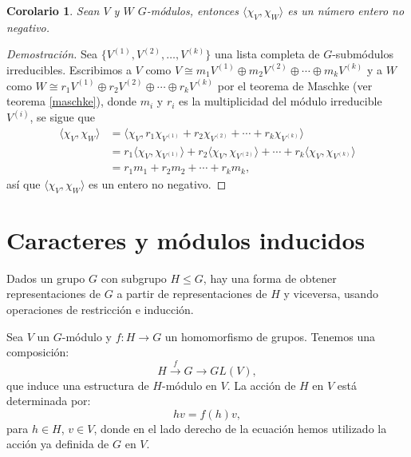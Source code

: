 \documentclass[12pt]{book}
\newtheorem{corollary}[theorem]{Corolario}
\theoremstyle{definition}
\newtheorem{definition}[theorem]{Definición}
\newcounter{in}
\newcounter{ini}
\begin{document}
\begin{corollary}
  \label{prod-car-pos}
  Sean $V$ y $W$ $G$-módulos, entonces $\langle\chi_{V},\chi_{W}\rangle$ es un número entero no negativo.
\end{corollary}
\begin{proof}[Demostración]
  Sea $\{V^{(1)},V^{(2)},\ldots,V^{(k)}\}$ una lista completa de $G$-submódulos
  irreducibles. Escribimos a $V$ como $V\cong
  m_{1}V^{(1)}\oplus m_{2}V^{(2)}\oplus\cdots\oplus m_{k}V^{(k)}$ y a $W$ como $W\cong
  r_{1}V^{(1)}\oplus r_{2}V^{(2)}\oplus\cdots\oplus r_{k}V^{(k)}$ por el
  teorema de Maschke (ver teorema \ref{maschke}), donde $m_{i}$ y $r_{i}$ es la multiplicidad del módulo
  irreducible $V^{(i)}$, se sigue que
  \begin{align*}
    \langle\chi_{V},\chi_{W}\rangle&=\langle\chi_{V},r_{1}\chi_{V^{(1)}}+r_{2}\chi_{V^{(2)}}+\cdots+r_{k}\chi_{V^{(k)}}\rangle\\
    &=r_{1}\langle\chi_{V},\chi_{V^{(1)}}\rangle+r_{2}\langle\chi_{V},\chi_{V^{(2)}}\rangle+\cdots+r_{k}\langle\chi_{V},\chi_{V^{(k)}}\rangle\\
    &=r_{1}m_{1}+r_{2}m_{2}+\cdots+r_{k}m_{k},
  \end{align*}
  así que  $\langle\chi_{V},\chi_{W}\rangle$ es un entero no
  negativo. 
\end{proof}

\section{Caracteres y módulos inducidos}
\label{carac-induc}

Dados un grupo $G$ con subgrupo $H\leq G$, hay una forma de obtener
representaciones de $G$ a partir de representaciones de $H$ y
viceversa, usando operaciones de
restricción e inducción.


Sea $V$ un $G$-módulo y $f:H\rightarrow G$ un homomorfismo de
grupos. Tenemos una composición:
\begin{equation*}
  H\stackrel{f}{\rightarrow}G \rightarrow GL(V),
\end{equation*}
que induce una estructura de $H$-módulo en $V$. La acción de $H$ en
$V$ está determinada por:
\begin{equation*}
  \label{rest}
  hv=f(h)v,
\end{equation*}
para $h\in H$, $v\in V$, donde en el lado derecho de la ecuación hemos
utilizado la acción ya definida de $G$ en $V$. 
\end{document}
